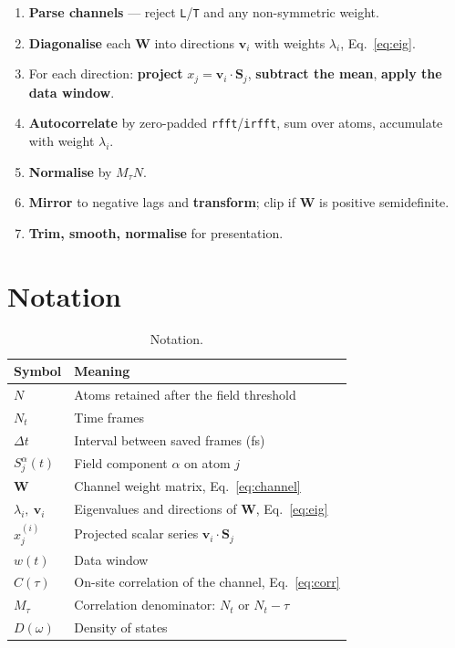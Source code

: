 \documentclass[12pt, a4paper, oneside]{article}
\newcommand{\vvec}{\mathbf{v}}
\newcommand{\Nt}{N_t}
\newcommand{\Na}{N}
\newcommand{\field}{S}
\newcommand{\Wmat}{\mathbf{W}}
\begin{document}
\begin{enumerate}
    \item \textbf{Parse channels} --- reject \texttt{L}/\texttt{T} and any
    non-symmetric weight.
    \item \textbf{Diagonalise} each $\Wmat$ into directions $\vvec_i$ with
    weights $\lambda_i$, Eq.~\eqref{eq:eig}.
    \item For each direction: \textbf{project} $x_j = \vvec_i\cdot\bm{\field}_j$,
    \textbf{subtract the mean}, \textbf{apply the data window}.
    \item \textbf{Autocorrelate} by zero-padded \texttt{rfft}/\texttt{irfft},
    sum over atoms, accumulate with weight $\lambda_i$.
    \item \textbf{Normalise} by $M_\tau \Na$.
    \item \textbf{Mirror} to negative lags and \textbf{transform}; clip if
    $\Wmat$ is positive semidefinite.
    \item \textbf{Trim, smooth, normalise} for presentation.
\end{enumerate}

\section{Notation}

\begin{table}[h]
    \centering
    \begin{tabular}{ll}
        \toprule
        Symbol & Meaning \\
        \midrule
        $\Na$ & Atoms retained after the field threshold \\
        $\Nt$ & Time frames \\
        $\Delta t$ & Interval between saved frames (fs) \\
        $\field_j^\alpha(t)$ & Field component $\alpha$ on atom $j$ \\
        $\Wmat$ & Channel weight matrix, Eq.~\eqref{eq:channel} \\
        $\lambda_i,\ \vvec_i$ & Eigenvalues and directions of $\Wmat$, Eq.~\eqref{eq:eig} \\
        $x_j^{(i)}$ & Projected scalar series $\vvec_i\cdot\bm{\field}_j$ \\
        $w(t)$ & Data window \\
        $C(\tau)$ & On-site correlation of the channel, Eq.~\eqref{eq:corr} \\
        $M_\tau$ & Correlation denominator: $\Nt$ or $\Nt-\tau$ \\
        $D(\omega)$ & Density of states \\
        \bottomrule
    \end{tabular}
    \caption{Notation.}
\end{table}
\end{document}
